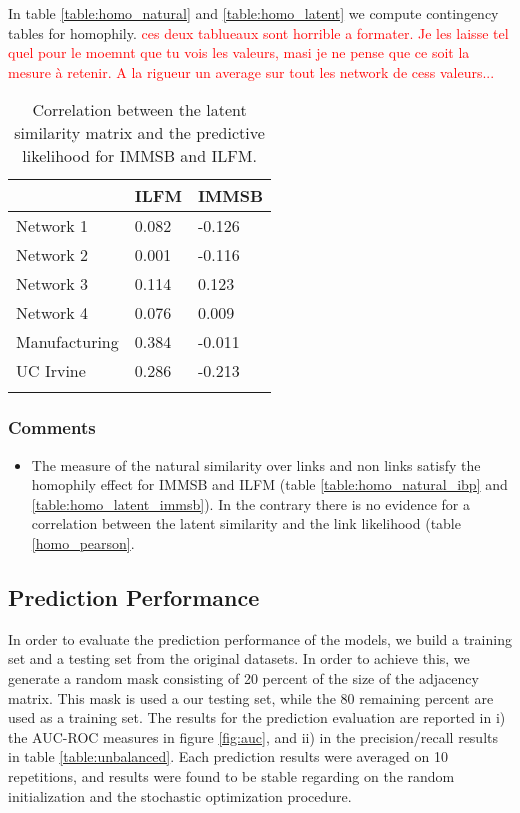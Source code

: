 \documentclass[a4paper, 12pt]{article}
\begin{document}
In table \ref{table:homo_natural} and \ref{table:homo_latent} we compute contingency tables for homophily.
\textcolor{red}{ces deux tablueaux sont horrible a formater. Je les laisse tel quel pour le moemnt que tu vois les valeurs, masi je ne pense que ce soit la mesure à retenir. A la rigueur un average sur tout les network de cess valeurs...}




\begin{table}[h]
    \caption{Correlation between the latent similarity matrix and the predictive likelihood for IMMSB and ILFM.}
    \centering
    \begin{tabular}{lll}
    \hline
    & ILFM  & IMMSB \\
    \hline
    Network 1     & 0.082 &  -0.126   \\
    Network 2     & 0.001     &  -0.116   \\
    Network 3     & 0.114     &  0.123    \\
    Network 4     & 0.076     &  0.009    \\
    Manufacturing & 0.384     &  -0.011   \\
    UC Irvine     & 0.286     &  -0.213   \\
    \hline
    \label{table:homo_pearson}
    \end{tabular}
\end{table}


\subsubsection{Comments}
\begin{itemize}
    \item The measure of the natural similarity over links and non links satisfy the homophily effect for IMMSB and ILFM (table \ref{table:homo_natural_ibp} and \ref{table:homo_latent_immsb}). In the contrary there is no evidence for a correlation between the latent similarity and the link likelihood (table \ref{homo_pearson}. 
\end{itemize}


\subsection{Prediction Performance}
In order to evaluate the  prediction performance of the models, we build a training set and a testing set from the original datasets. In order to achieve this, we generate a random mask consisting of 20 percent of the size of the adjacency matrix. This mask is used a our testing set, while the 80 remaining percent are used as a training set. The results for the prediction evaluation are reported in i) the AUC-ROC measures in figure \ref{fig:auc}, and ii) in the precision/recall results in table \ref{table:unbalanced}.
Each prediction results were averaged on 10 repetitions, and results were found to be stable regarding on the random  initialization and the stochastic optimization procedure. 
\end{document}

